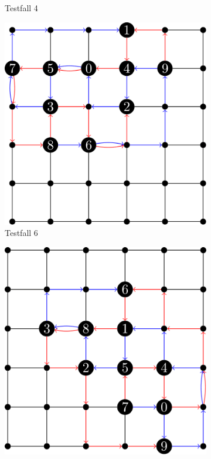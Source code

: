 \documentclass[bachelor, german]{algothesis}
\begin{document}
\begin{figure}[H]
\begin{subfigure}[b]{0.45\textwidth}
        \caption{Testfall 4}
        \label{fig:teilbild_b}
    \end{subfigure}
    \begin{subfigure}[b]{0.45\textwidth}
        \centering
        \includegraphics[width=\textwidth]{figures/Testfall6.png}
        \caption{Testfall 6}
        \label{fig:teilbild_c}
    \end{subfigure}
    \hfill
    \begin{subfigure}[b]{0.45\textwidth}
        \centering
        \includegraphics[width=\textwidth]{figures/Testfall7.png}

\end{subfigure}
\end{figure}
\end{document}
